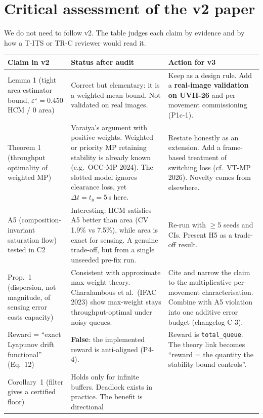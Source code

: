 \documentclass[11pt,a4paper]{article}
\begin{document}
\section{Critical assessment of the v2 paper}
We do not need to follow v2. The table judges each claim by evidence and by how a T-ITS or
TR-C reviewer would read it.

\small
\begin{longtable}{@{}p{3.6cm}p{5.6cm}p{6.6cm}@{}}
\toprule
Claim in v2 & Status after audit & Action for v3 \\
\midrule
\endhead
Lemma 1 (tight area-estimator bound, $\varepsilon^\star=0.450$ HCM / 0 area) &
  Correct but elementary: it is a weighted-mean bound. Not validated on real images. &
  Keep as a design rule. Add a \textbf{real-image validation on UVH-26} and per-movement
  commissioning (P1c-1). \\
Theorem 1 (throughput optimality of weighted MP) &
  Varaiya's argument with positive weights. Weighted or priority MP retaining stability is
  already known (e.g.\ OCC-MP 2024). The slotted model ignores clearance loss, yet
  $\Delta t = t_y = 5$\,s here. &
  Restate honestly as an extension. Add a frame-based treatment of switching loss (cf.\
  VT-MP 2026). Novelty comes from elsewhere. \\
A5 (composition-invariant saturation flow) tested in C2 &
  Interesting: HCM satisfies A5 better than area (CV 1.9\% vs 7.5\%), while area is exact for
  sensing. A genuine trade-off, but from a single unseeded pre-fix run. &
  Re-run with $\ge$5 seeds and CIs. Present H5 as a trade-off result. \\
Prop.~1 (dispersion, not magnitude, of sensing error costs capacity) &
  Consistent with approximate max-weight theory. Charalambous et al.\ (IFAC 2023) show
  max-weight stays throughput-optimal under noisy queues. &
  Cite and narrow the claim to the multiplicative per-movement characterisation. Combine
  with A5 violation into one additive error budget (changelog C-3). \\
Reward = ``exact Lyapunov drift functional'' (Eq.~12) &
  \textbf{False}: the implemented reward is anti-aligned (P4-4). &
  Reward is \texttt{total\_queue}. The theory link becomes ``reward = the quantity the
  stability bound controls''. \\
Corollary~1 (filter gives a certified floor) &
  Holds only for infinite buffers. Deadlock exists in practice. The benefit is directional

\end{longtable}
\end{document}
